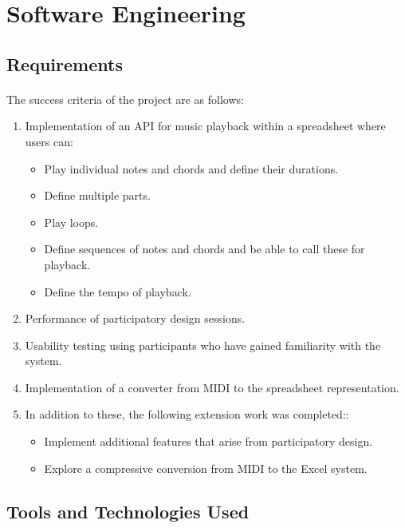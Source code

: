 \section{Software Engineering}

\subsection{Requirements}

\paragraph{} The success criteria of the project are as follows:

\begin{enumerate}
  \item Implementation of an API for music playback within a spreadsheet where users can:
  \begin{itemize}
     \item Play individual notes and chords and define their durations.
     \item Define multiple parts.
     \item Play loops.
     \item Define sequences of notes and chords and be able to call these for playback.
     \item Define the tempo of playback.
   \end{itemize}
  \item Performance of participatory design sessions.
  \item Usability testing using participants who have gained familiarity with the system.
  \item Implementation of a converter from MIDI to the spreadsheet representation.
  \item In addition to these, the following extension work was completed::
  \begin{itemize}
     \item Implement additional features that arise from participatory design.
     \item Explore a compressive conversion from MIDI to the Excel system.
   \end{itemize}
\end{enumerate}

\subsection{Tools and Technologies Used}

